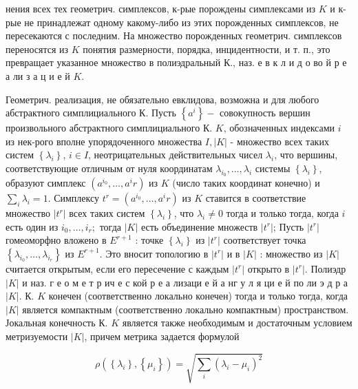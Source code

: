 \documentclass[10pt]{article}
\begin{document}
нения всех тех геометрич. симплексов, к-рые порождены симплексами из $K$ и к-рые не принадлежат одному какому-либо из этих порожденных симплексов, не пересекаются с последним. На множество порожденных геометрич. симплексов переносятся из $K$ понятия размерности, порядка, инцидентности, и т. п., это превращает указанное множество в полиэдральный К., наз. е в к л и д о во й р е а ли з а ц и е й $K$.



Геометрич. реализация, не обязательно евклидова, возможна и для любого абстрактного симплициального К. Пусть $\left\{a^{i}\right\}-$ совокупность вершин произвольного абстрактного симплициального К. $K$, обозначенных индексами $i$ из нек-рого вполне упорядоченного множества $I,|K|$ - множество всех таких систем $\left\{\lambda_{i}\right\}$, $i \in I$, неотрицательных действительных чисел $\lambda_{i}$, что вершины, соответствующие отличным от нуля координатам $\lambda_{i_{0}}, \ldots, \lambda_{i}$ системы $\left\{\lambda_{i}\right\}$, образуют симплекс $\left(a^{i_{0}}, \ldots, a^{i} r\right)$ из $K$ (число таких координат конечно) и $\sum_{i} \lambda_{i}=1$. Симплексу $t^{r}=\left(a^{i_{0}}, \ldots, a^{i} r\right)$ из $K$ ставится в соответствие множество $\left|t^{r}\right|$ всех таких систем $\left\{\lambda_{i}\right\}$, что $\lambda_{i} \neq 0$ тогда и только тогда, когда $i$ есть один из $i_{0}, \ldots, i_{r} ;$ тогда $|K|$ есть объединение множеств $\left|t^{r}\right|$; Пусть $\left|t^{r}\right|$ гомеоморфно вложено в $E^{r+1}$ : точке $\left\{\lambda_{i}\right\}$ из $\left|t^{r}\right|$ соответствует точка $\left\{\lambda_{i_{0}}, \ldots, \lambda_{i_{r}}\right\}$ из $E^{r+1}$. Это вносит топологию в $\left|t^{r}\right|$ и в $|K|$ : множество из $|K|$ считается открытым, если его пересечение с каждым $\left|t^{r}\right|$ открыто в $\left|t^{r}\right|$. Полиэдр $|K|$ и наз. г е о м е т р ич е с кой р е а лизаци е й а нг у л я ци е й по ли э д р а $|K|$. К. $K$ конечен (соответственно локально конечен) тогда и только тогда, когда $|K|$ является компактным (соответственно локально компактным) пространством. Јокальная конечность К. $K$ является также необходимым и достаточным условием метризуемости $|K|$, причем метрика задается формулой



\[

\rho\left(\left\{\lambda_{i}\right\},\left\{\mu_{i}\right\}\right)=\sqrt{\sum_{i}\left(\lambda_{i}-\mu_{i}\right)^{2}}

\]
\end{document}
